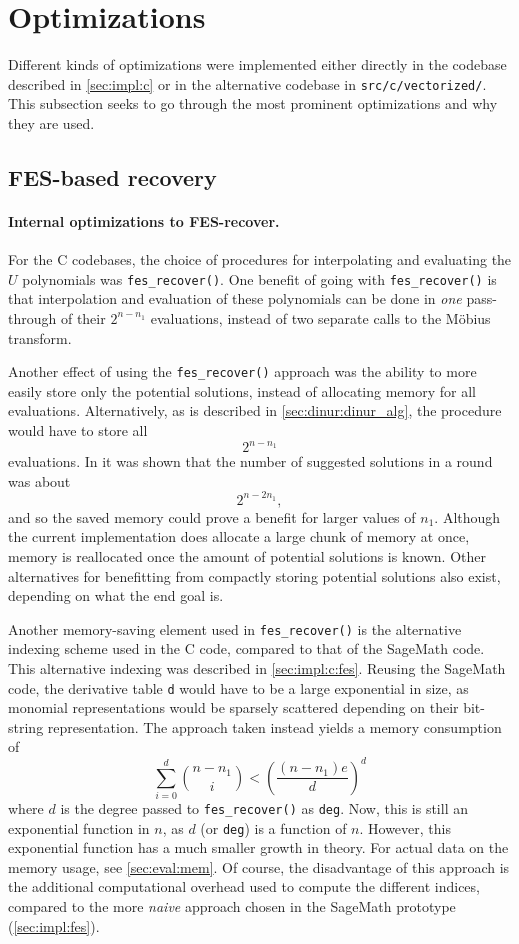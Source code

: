 \section{Optimizations} \label{sec:impl:opt}
Different kinds of optimizations were implemented either directly in the codebase described in \cref{sec:impl:c} or in the alternative codebase in \texttt{src/c/vectorized/}. This subsection seeks to go through the most prominent optimizations and why they are used.

\subsection{FES-based recovery} \label{sec:impl:opt:fes_rec}
\paragraph{Internal optimizations to FES-recover.} For the C codebases, the choice of procedures for interpolating and evaluating the $U$ polynomials was \texttt{fes\_recover()}. One benefit of going with \texttt{fes\_recover()} is that interpolation and evaluation of these polynomials can be done in \textit{one} pass-through of their $2^{n - n_1}$ evaluations, instead of two separate calls to the Möbius transform.

Another effect of using the \texttt{fes\_recover()} approach was the ability to more easily store only the potential solutions, instead of allocating memory for all evaluations. Alternatively, as is described in \cref{sec:dinur:dinur_alg}, the procedure would have to store all 
$$
    2^{n - n_1}
$$ 
evaluations. In \cite{eurocrypt-2021-30841} it was shown that the number of suggested solutions in a round was about 
$$
    2^{n - 2n_1},
$$
and so the saved memory could prove a benefit for larger values of $n_1$. Although the current implementation does allocate a large chunk of memory at once, memory is reallocated once the amount of potential solutions is known. Other alternatives for benefitting from compactly storing potential solutions also exist, depending on what the end goal is.

Another memory-saving element used in \texttt{fes\_recover()} is the alternative indexing scheme used in the C code, compared to that of the SageMath code. This alternative indexing was described in \cref{sec:impl:c:fes}. Reusing the SageMath code, the derivative table \texttt{d} would have to be a large exponential in size, as monomial representations would be sparsely scattered depending on their bit-string representation. The approach taken instead yields a memory consumption of 
$$
    \sum_{i = 0 }^{d} \binom{n - n_1}{i} < \left(\frac{(n - n_1)e}{d}\right)^d
$$
where $d$ is the degree passed to \texttt{fes\_recover()} as \texttt{deg}. Now, this is still an exponential function in $n$, as $d$ (or \texttt{deg}) is a function of $n$. However, this exponential function has a much smaller growth in theory. For actual data on the memory usage, see \cref{sec:eval:mem}. Of course, the disadvantage of this approach is the additional computational overhead used to compute the different indices, compared to the more \textit{naive} approach chosen in the SageMath prototype (\cref{sec:impl:fes}).

